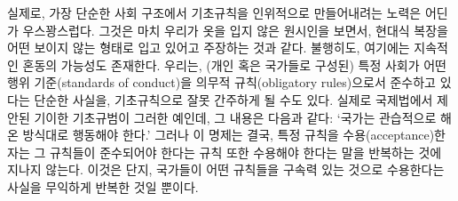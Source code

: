 실제로, 가장 단순한 사회 구조에서 기초규칙을 인위적으로 만들어내려는
노력은 어딘가 우스꽝스럽다. 그것은 마치 우리가 옷을 입지 않은 원시인을
보면서,  현대식 복장을 어떤 보이지 않는 형태로 입고
있어고 주장하는 것과 같다. 불행히도, 여기에는
지속적인 혼동의 가능성도 존재한다. 우리는, (개인 혹은 국가들로 구성된)
특정 사회가 어떤 행위 기준(standards of conduct)을 의무적
규칙(obligatory rules)으로서 준수하고 있다는 단순한 사실을, 기초규칙으로
잘못 간주하게 될 수도 있다. 실제로 국제법에서 제안된 기이한 기초규범이
그러한 예인데, 그 내용은 다음과 같다: `국가는 관습적으로 해온 방식대로
행동해야 한다.' 그러나 이 명제는 결국, 특정 규칙을 수용(acceptance)한
자는 그 규칙들이 준수되어야 한다는 규칙 또한 수용해야 한다는 말을
반복하는 것에 지나지 않는다. 이것은 단지, 국가들이 어떤 규칙들을 구속력
있는 것으로 수용한다는 사실을 무익하게 반복한 것일 뿐이다.

